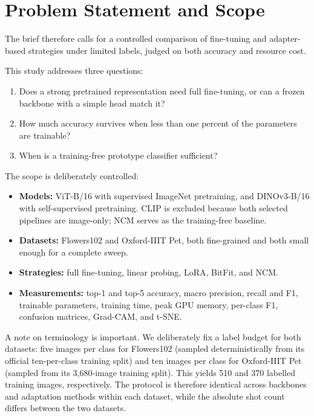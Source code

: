 \documentclass[journal,11pt]{IEEEtran}
\begin{document}
\section{Problem Statement and Scope}
\label{sec:problem}

The brief therefore calls for a controlled comparison of fine-tuning and adapter-based strategies under limited labels, judged on both accuracy and resource cost.

This study addresses three questions:
\begin{enumerate}
  \item Does a strong pretrained representation need full fine-tuning, or can a frozen backbone with a simple head match it?
  \item How much accuracy survives when less than one percent of the parameters are trainable?
  \item When is a training-free prototype classifier sufficient?
\end{enumerate}

The scope is deliberately controlled:
\begin{itemize}
  \item \textbf{Models:} ViT-B/16 with supervised ImageNet pretraining, and DINOv3-B/16 with self-supervised pretraining. CLIP is excluded because both selected pipelines are image-only; NCM serves as the training-free baseline.
  \item \textbf{Datasets:} Flowers102 and Oxford-IIIT Pet, both fine-grained and both small enough for a complete sweep.
  \item \textbf{Strategies:} full fine-tuning, linear probing, LoRA, BitFit, and NCM.
  \item \textbf{Measurements:} top-1 and top-5 accuracy, macro precision, recall and F1, trainable parameters, training time, peak GPU memory, per-class F1, confusion matrices, Grad-CAM, and t-SNE.
\end{itemize}

A note on terminology is important. We deliberately fix a label budget for both datasets: five images per class for Flowers102 (sampled deterministically from its official ten-per-class training split) and ten images per class for Oxford-IIIT Pet (sampled from its 3{,}680-image training split). This yields 510 and 370 labelled training images, respectively. The protocol is therefore identical across backbones and adaptation methods within each dataset, while the absolute shot count differs between the two datasets.
\end{document}
